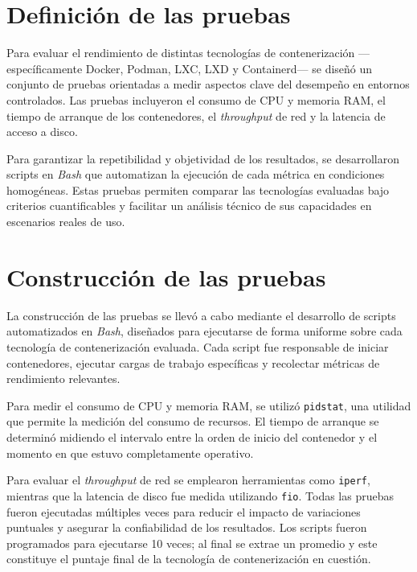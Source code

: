 \label{cap:benchmarking}

\section{Definición de las pruebas}

Para evaluar el rendimiento de distintas tecnologías de contenerización —específicamente Docker, Podman, LXC, LXD y Containerd— se diseñó un conjunto de pruebas orientadas a medir aspectos clave del desempeño en entornos controlados. Las pruebas incluyeron el consumo de CPU y memoria RAM, el tiempo de arranque de los contenedores, el \textit{throughput} de red y la latencia de acceso a disco. 

Para garantizar la repetibilidad y objetividad de los resultados, se desarrollaron scripts en \textit{Bash} que automatizan la ejecución de cada métrica en condiciones homogéneas. Estas pruebas permiten comparar las tecnologías evaluadas bajo criterios cuantificables y facilitar un análisis técnico de sus capacidades en escenarios reales de uso.

\section{Construcción de las pruebas}

La construcción de las pruebas se llevó a cabo mediante el desarrollo de scripts automatizados en \textit{Bash}, diseñados para ejecutarse de forma uniforme sobre cada tecnología de contenerización evaluada. Cada script fue responsable de iniciar contenedores, ejecutar cargas de trabajo específicas y recolectar métricas de rendimiento relevantes.

Para medir el consumo de CPU y memoria RAM, se utilizó \texttt{pidstat}, una utilidad que permite la medición del consumo de recursos. El tiempo de arranque se determinó midiendo el intervalo entre la orden de inicio del contenedor y el momento en que estuvo completamente operativo. 

Para evaluar el \textit{throughput} de red se emplearon herramientas como \texttt{iperf}, mientras que la latencia de disco fue medida utilizando \texttt{fio}. Todas las pruebas fueron ejecutadas múltiples veces para reducir el impacto de variaciones puntuales y asegurar la confiabilidad de los resultados. Los scripts fueron programados para ejecutarse 10 veces; al final se extrae un promedio y este constituye el puntaje final de la tecnología de contenerización en cuestión.

